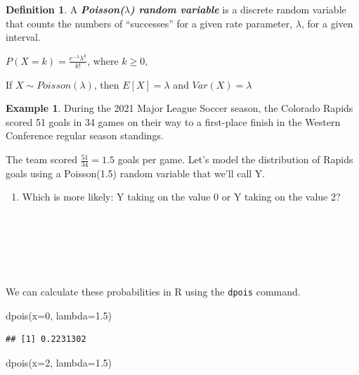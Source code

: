\documentclass[
  11pt,
]{book}
\newenvironment{Shaded}{\begin{snugshade}}{\end{snugshade}}
\newcommand{\AttributeTok}[1]{\textcolor[rgb]{0.77,0.63,0.00}{#1}}
\newcommand{\DecValTok}[1]{\textcolor[rgb]{0.00,0.00,0.81}{#1}}
\newcommand{\FloatTok}[1]{\textcolor[rgb]{0.00,0.00,0.81}{#1}}
\newcommand{\FunctionTok}[1]{\textcolor[rgb]{0.00,0.00,0.00}{#1}}
\newcommand{\NormalTok}[1]{#1}
\providecommand{\tightlist}{%
  \setlength{\itemsep}{0pt}\setlength{\parskip}{0pt}}
\theoremstyle{definition}
\newtheorem{definition}{Definition}[chapter]
\theoremstyle{definition}
\newtheorem{example}{Example}[chapter]
\theoremstyle{definition}
\theoremstyle{definition}
\theoremstyle{remark}
\begin{document}
\begin{definition}
A \textbf{\emph{Poisson(\(\lambda\)) random variable}} is a discrete random variable that counts the numbers of ``successes'' for a given rate parameter, \(\lambda\), for a given interval.

\(P(X=k) = \frac{e^{-\lambda}\lambda^k}{k!}\), where \(k \geq 0,\)

If \(X \sim Poisson(\lambda)\), then \(E[X]=\lambda\) and \(Var(X)=\lambda\)
\end{definition}

\begin{example}
During the 2021 Major League Soccer season, the Colorado Rapids scored 51 goals in 34 games on their way to a first-place finish in the Western Conference regular season standings.

The team scored \(\frac{51}{34} = 1.5\) goals per game. Let's model the distribution of Rapids goals using a Poisson(1.5) random variable that we'll call Y.
\end{example}

\begin{enumerate}
\def\labelenumi{(\alph{enumi})}
\tightlist
\item
  Which is more likely: Y taking on the value 0 or Y taking on the value 2?\\
  \strut \\
  \strut \\
  \strut \\
\end{enumerate}

We can calculate these probabilities in R using the \texttt{dpois} command.

\begin{Shaded}
\begin{Highlighting}[]
\FunctionTok{dpois}\NormalTok{(}\AttributeTok{x=}\DecValTok{0}\NormalTok{, }\AttributeTok{lambda=}\FloatTok{1.5}\NormalTok{)}
\end{Highlighting}
\end{Shaded}

\begin{verbatim}
## [1] 0.2231302
\end{verbatim}

\begin{Shaded}
\begin{Highlighting}[]
\FunctionTok{dpois}\NormalTok{(}\AttributeTok{x=}\DecValTok{2}\NormalTok{, }\AttributeTok{lambda=}\FloatTok{1.5}\NormalTok{)}
\end{Highlighting}
\end{Shaded}
\end{document}
